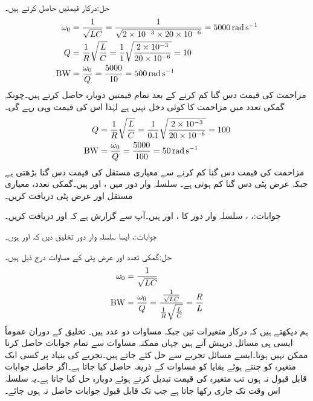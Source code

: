 حل:درکار قیمتیں حاصل کرتے ہیں۔
\begin{align*}
\omega_0&=\frac{1}{\sqrt{LC}}=\frac{1}{\sqrt{2\times 10^{-3}\times 20\times 10^{-6}}}=\SI{5000}{\radian\per\second}\\
Q&=\frac{1}{R}\sqrt{\frac{L}{C}}=\frac{1}{1}\sqrt{\frac{2\times 10^{-3}}{20\times 10^{-6}}}=10\\
{{\textup{BW}}}&=\frac{\omega_0}{Q}=\frac{5000}{10}=\SI{500}{\radian\per\second}
\end{align*}
مزاحمت کی قیمت دس گنا کم کرنے کے بعد تمام قیمتیں دوبارہ حاصل کرتے ہیں۔چونکہ گمکی تعدد میں مزاحمت کا کوئی دخل نہیں ہے لہٰذا اس کی قیمت وہی رہے گی۔
\begin{align*}
Q&=\frac{1}{R}\sqrt{\frac{L}{C}}=\frac{1}{0.1}\sqrt{\frac{2\times 10^{-3}}{20\times 10^{-6}}}=100\\
{{\textup{BW}}}&=\frac{\omega_0}{Q}=\frac{5000}{100}=\SI{50}{\radian\per\second}
\end{align*}
مزاحمت کی قیمت دس گنا کم کرنے سے معیاری مستقل کی قیمت دس گنا بڑھتی ہے جبکہ عرض پٹی دس گنا کم ہوتی ہے۔
سلسلہ وار  دور میں ،  اور  ہیں۔گمکی تعدد، معیاری مستقل اور عرض پٹی دریافت کریں۔

جوابات:، ، 
سلسلہ وار  دور کا ،  اور  ہیں۔آپ سے گزارش ہے کہ  اور  دریافت کریں۔

جوابات:، 
ایسا سلسلہ وار  دور تخلیق دیں کہ  اور  ہوں۔

حل:گمکی تعدد اور عرض پٹی کے مساوات درج ذیل ہیں۔
\begin{align*}
\omega_0&=\frac{1}{\sqrt{LC}}\\
{{\textup{BW}}}&=\frac{\omega_0}{Q}=\frac{\frac{1}{\sqrt{LC}}}{\frac{1}{R}\sqrt{\frac{L}{C}}}=\frac{R}{L}
\end{align*}
ہم دیکھتے ہیں کہ درکار متغیرات تین جبکہ مساوات دو عدد ہیں۔ تخلیق کے دوران عموماً ایسی ہی مسائل درپیش آتے ہیں جہاں ممکنہ مساوات سے تمام جوابات حاصل کرنا ممکن نہیں ہوتا۔ایسے مسائل تجربے سے حل کئے جاتے ہیں۔تجربے کی بنیاد پر کسی ایک متغیرہ کو چنتے ہوئے بقایا کو مساوات کے ذریعہ حاصل کیا جاتا ہے۔اگر حاصل جوابات قابل قبول نہ ہوں تب متغیرہ کی قیمت تبدیل کرتے ہوئے دوبارہ حل کیا جاتا ہے۔یہ سلسلہ اس وقت تک جاری رکھا جاتا ہے جب تک قابل قبول جوابات حاصل نہ ہوں جائے۔

